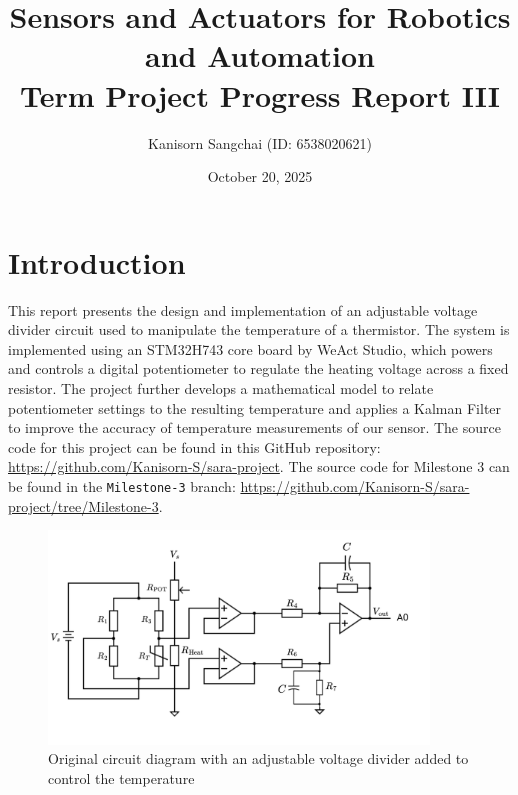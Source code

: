 \documentclass[12pt,a4paper]{article}
\title{Sensors and Actuators for Robotics and
Automation\\Term Project Progress Report III}
\author{Kanisorn Sangchai (ID: 6538020621)}
\date{October 20, 2025}
\begin{document}
\maketitle

\section{Introduction}
This report presents the design and implementation of an adjustable voltage divider circuit used to manipulate the temperature of a thermistor. The system is implemented using an STM32H743 core board by WeAct Studio, which powers and controls a digital potentiometer to regulate the heating voltage across a fixed resistor. The project further develops a mathematical model to relate potentiometer settings to the resulting temperature and applies a Kalman Filter to improve the accuracy of temperature measurements of our sensor. The source code for this project can be found in this GitHub repository: \url{https://github.com/Kanisorn-S/sara-project}. The source code for Milestone 3 can be found in the \texttt{Milestone-3} branch: \url{https://github.com/Kanisorn-S/sara-project/tree/Milestone-3}.

\begin{figure}[h]
    \centering
    \includegraphics[width=0.9\textwidth]{images/circuit_diagram.png}
    \caption{Original circuit diagram with an adjustable voltage divider added to control the temperature}
    \label{fig:circuit}
\end{figure}
\end{document}
